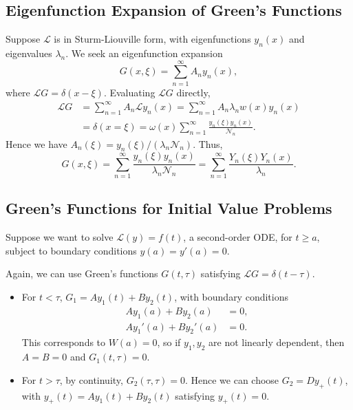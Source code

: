 \documentclass[12pt]{article}
\begin{document}
\subsection{Eigenfunction Expansion of Green's Functions}%
\label{sub:eigenfunction_expansion_of_green_s_functions}

Suppose $\mathcal{L}$ is in Sturm-Liouville form, with eigenfunctions $y_n(x)$ and eigenvalues $\lambda_n$. We seek an eigenfunction expansion
\[
	G(x, \xi) = \sum_{n = 1}^{\infty}A_n y_n(x),
\]
where $\mathcal{L}G = \delta(x - \xi)$. Evaluating $\mathcal{L}G$ directly,
\begin{align*}
	\mathcal{L}G &= \sum_{n = 1}^{\infty} A_n \mathcal{L}y_n(x) = \sum_{n = 1}^{\infty} A_n \lambda_n w(x) y_n(x) \\
		     &= \delta(x = \xi) = \omega(x) \sum_{n = 1}^{\infty} \frac{y_n(\xi) y_n(x)}{\mathcal{N}_n}.
\end{align*}
Hence we have $A_n(\xi) = y_n(\xi)/(\lambda_n \mathcal{N}_n)$. Thus,
\[
	G(x, \xi) = \sum_{n = 1}^{\infty}\frac{y_n(\xi)y_n(x)}{\lambda_n \mathcal{N}_n} = \sum_{n = 1}^{\infty} \frac{Y_n(\xi) Y_n(x)}{\lambda_n}
.\]

\subsection{Green's Functions for Initial Value Problems}%
\label{sub:green_s_functions_for_initial_value_problems}

Suppose we want to solve $\mathcal{L}(y) = f(t)$, a second-order ODE, for $t \geq a$, subject to boundary conditions $y(a) = y'(a) = 0$.

Again, we can use Green's functions $G(t, \tau)$ satisfying $\mathcal{L}G = \delta(t - \tau)$.

\begin{itemize}
	\item For $t < \tau$, $G_1 = Ay_1(t) + By_2(t)$, with boundary conditions
		\begin{align*}
			Ay_1(a) + By_2(a) &= 0, \\
			Ay_1'(a) + By_2'(a) &= 0.
		\end{align*}
		This corresponds to $W(a) = 0$, so if $y_1, y_2$ are not linearly dependent, then $A = B = 0$ and $G_1(t, \tau) = 0$.
	\item For $t > \tau$, by continuity, $G_2(\tau, \tau) = 0$. Hence we can choose $G_2 = D y_{+}(t)$, with $y_{+}(t) = Ay_1(t) + By_2(t)$ satisfying $y_{+}(t) = 0$.
\end{itemize}
\end{document}

